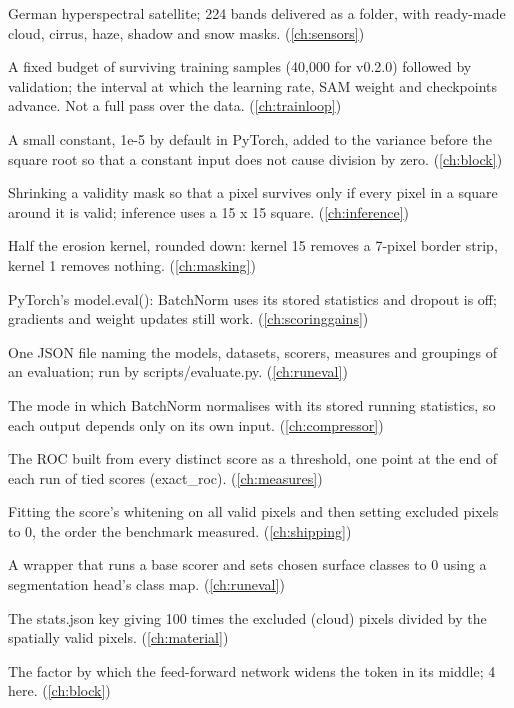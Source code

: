 \begin{description}[style=nextline,leftmargin=1.2em,font=\normalfont\bfseries]
\item[EnMAP] German hyperspectral satellite; 224 bands delivered as a folder, with ready-made cloud, cirrus, haze, shadow and snow masks. (\cref{ch:sensors})
\item[Epoch (in this project)] A fixed budget of surviving training samples (40,000 for v0.2.0) followed by validation; the interval at which the learning rate, SAM weight and checkpoints advance. Not a full pass over the data. (\cref{ch:trainloop})
\item[Epsilon (normalisation)] A small constant, 1e-5 by default in PyTorch, added to the variance before the square root so that a constant input does not cause division by zero. (\cref{ch:block})
\item[Erosion] Shrinking a validity mask so that a pixel survives only if every pixel in a square around it is valid; inference uses a 15 x 15 square. (\cref{ch:inference})
\item[Erosion radius] Half the erosion kernel, rounded down: kernel 15 removes a 7-pixel border strip, kernel 1 removes nothing. (\cref{ch:masking})
\item[Eval mode] PyTorch's model.eval(): BatchNorm uses its stored statistics and dropout is off; gradients and weight updates still work. (\cref{ch:scoringgains})
\item[Evaluation config] One JSON file naming the models, datasets, scorers, measures and groupings of an evaluation; run by scripts/evaluate.py. (\cref{ch:runeval})
\item[Evaluation mode] The mode in which BatchNorm normalises with its stored running statistics, so each output depends only on its own input. (\cref{ch:compressor})
\item[Exact ROC] The ROC built from every distinct score as a threshold, one point at the end of each run of tied scores (exact\_roc). (\cref{ch:measures})
\item[Exclude after scoring] Fitting the score's whitening on all valid pixels and then setting excluded pixels to 0, the order the benchmark measured. (\cref{ch:shipping})
\item[Exclude scorer] A wrapper that runs a base scorer and sets chosen surface classes to 0 using a segmentation head's class map. (\cref{ch:runeval})
\item[excluded\_percent] The stats.json key giving 100 times the excluded (cloud) pixels divided by the spatially valid pixels. (\cref{ch:material})
\item[Expansion ratio] The factor by which the feed-forward network widens the token in its middle; 4 here. (\cref{ch:block})

\end{description}

